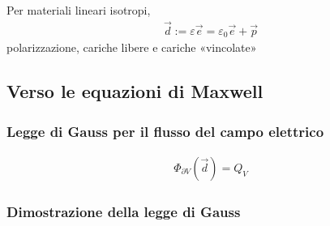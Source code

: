 \documentclass[letterpaper,10pt,italian]{jupyterBook}
\begin{document}
\sphinxAtStartPar
Per materiali lineari isotropi,
\begin{equation*}
\begin{split}\vec{d} := \varepsilon \vec{e} = \varepsilon_0 \vec{e} + \vec{p}\end{split}
\end{equation*}
\sphinxAtStartPar
{} polarizzazione, cariche libere e cariche «vincolate»


\subsection{Verso le equazioni di Maxwell}
\label{\detokenize{ch/electromagnetism/electrostatics:verso-le-equazioni-di-maxwell}}\label{\detokenize{ch/electromagnetism/electrostatics:physics-hs-electromagnetism-electrostatics-maxwell}}

\subsubsection{Legge di Gauss per il flusso del campo elettrico}
\label{\detokenize{ch/electromagnetism/electrostatics:legge-di-gauss-per-il-flusso-del-campo-elettrico}}\label{\detokenize{ch/electromagnetism/electrostatics:physics-hs-electromagnetism-electrostatics-maxwell-gauss}}\begin{equation*}
\begin{split}\Phi_{\partial V}(\vec{d}) = Q_V\end{split}
\end{equation*}\subsubsection*{Dimostrazione della legge di Gauss}
\end{document}
